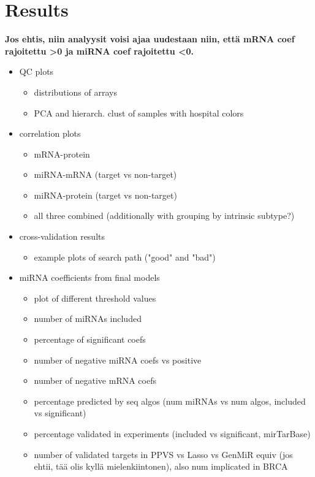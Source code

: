 
\section{Results}

\textbf{Jos ehtis, niin analyysit voisi ajaa uudestaan niin, että
mRNA coef rajoitettu >0 ja miRNA coef rajoitettu <0.}

\begin{itemize}
  \item QC plots
  \begin{itemize}
    \item distributions of arrays
    \item PCA and hierarch. clust of samples with hospital colors
  \end{itemize}
  \item correlation plots
  \begin{itemize}
    \item mRNA-protein
    \item miRNA-mRNA (target vs non-target)
    \item miRNA-protein (target vs non-target)
    \item all three combined (additionally with grouping by intrinsic subtype?)
  \end{itemize}
  \item cross-validation results
  \begin{itemize}
    \item example plots of search path ("good" and "bad")
  \end{itemize}
  \item miRNA coefficients from final models
  \begin{itemize}
  	\item plot of different threshold values
    \item number of miRNAs included
    \item percentage of significant coefs
    \item number of negative miRNA coefs vs positive
    \item number of negative mRNA coefs
    \item percentage predicted by seq algos (num miRNAs vs num algos, included vs significant)
    \item percentage validated in experiments (included vs significant, mirTarBase)
    \item number of validated targets in PPVS vs Lasso vs GenMiR equiv (jos ehtii, tää olis kyllä mielenkiintonen), also num implicated in BRCA

\end{itemize}
\end{itemize}
